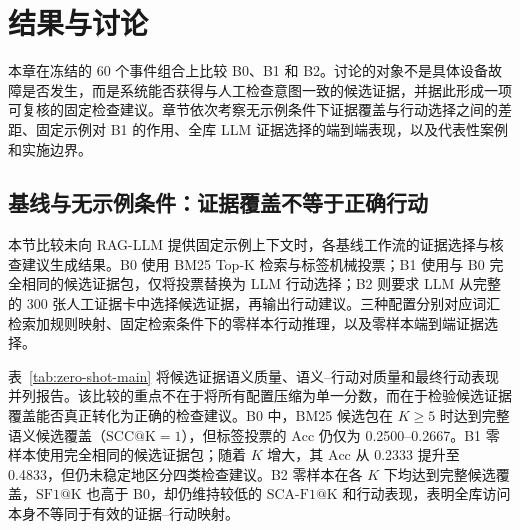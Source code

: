 \section{结果与讨论}

本章在冻结的 60 个事件组合上比较 B0、B1 和 B2。讨论的对象不是具体设备故障是否发生，而是系统能否获得与人工检查意图一致的候选证据，并据此形成一项可复核的固定检查建议。章节依次考察无示例条件下证据覆盖与行动选择之间的差距、固定示例对 B1 的作用、全库 LLM 证据选择的端到端表现，以及代表性案例和实施边界。

\subsection{基线与无示例条件：证据覆盖不等于正确行动}

本节比较未向 RAG-LLM 提供固定示例上下文时，各基线工作流的证据选择与核查建议生成结果。B0 使用 BM25 Top-K 检索与标签机械投票；B1 使用与 B0 完全相同的候选证据包，仅将投票替换为 LLM 行动选择；B2 则要求 LLM 从完整的 300 张人工证据卡中选择候选证据，再输出行动建议。三种配置分别对应词汇检索加规则映射、固定检索条件下的零样本行动推理，以及零样本端到端证据选择。

表~\ref{tab:zero-shot-main} 将候选证据语义质量、语义--行动对质量和最终行动表现并列报告。该比较的重点不在于将所有配置压缩为单一分数，而在于检验候选证据覆盖能否真正转化为正确的检查建议。B0 中，BM25 候选包在 \(K\geq5\) 时达到完整语义候选覆盖（\(\mathrm{SCC@K}=1\)），但标签投票的 \(\mathrm{Acc}\) 仍仅为 0.2500--0.2667。B1 零样本使用完全相同的候选证据包；随着 \(K\) 增大，其 \(\mathrm{Acc}\) 从 0.2333 提升至 0.4833，但仍未稳定地区分四类检查建议。B2 零样本在各 \(K\) 下均达到完整候选覆盖，\(\mathrm{SF1@K}\) 也高于 B0，却仍维持较低的 \(\mathrm{SCA\mbox{-}F1@K}\) 和行动表现，表明全库访问本身不等同于有效的证据--行动映射。

